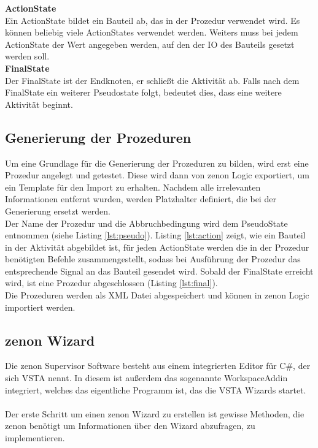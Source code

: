 \textbf{ActionState}\\
Ein ActionState bildet ein Bauteil ab, das in der Prozedur verwendet wird. Es können beliebig viele ActionStates verwendet werden. Weiters muss bei jedem ActionState der Wert angegeben werden, auf den der IO des Bauteils gesetzt werden soll.\\


\textbf{FinalState}\\
Der FinalState ist der Endknoten, er schließt die Aktivität ab. Falls nach dem FinalState ein weiterer Pseudostate folgt, bedeutet dies, dass eine weitere Aktivität beginnt.\\


\subsection{Generierung der Prozeduren}
Um eine Grundlage für die Generierung der Prozeduren zu bilden, wird erst eine Prozedur angelegt und getestet. Diese wird dann von zenon Logic exportiert, um ein Template für den Import zu erhalten. Nachdem alle irrelevanten Informationen entfernt wurden, werden Platzhalter definiert, die bei der Generierung ersetzt werden.\\

Der Name der Prozedur und die Abbruchbedingung wird dem PseudoState entnommen (siehe Listing \ref{lst:pseudo}). Listing \ref{lst:action} zeigt, wie ein Bauteil in der Aktivität abgebildet ist, für jeden ActionState werden die in der Prozedur benötigten Befehle zusammengestellt, sodass bei Ausführung der Prozedur das entsprechende Signal an das Bauteil gesendet wird. Sobald der FinalState erreicht wird, ist eine Prozedur abgeschlossen (Listing \ref{lst:final}).\\

Die Prozeduren werden als XML Datei abgespeichert und können in zenon Logic importiert werden.

\subsection{zenon Wizard}
Die zenon Supervisor Software besteht aus einem integrierten Editor für C\#, der sich VSTA nennt. In diesem ist außerdem das sogenannte WorkspaceAddin integriert, welches das eigentliche Programm ist, das die VSTA Wizards startet.\\\\
Der erste Schritt um einen zenon Wizard zu erstellen ist gewisse Methoden, die zenon benötigt um Informationen über den Wizard abzufragen, zu implementieren.


